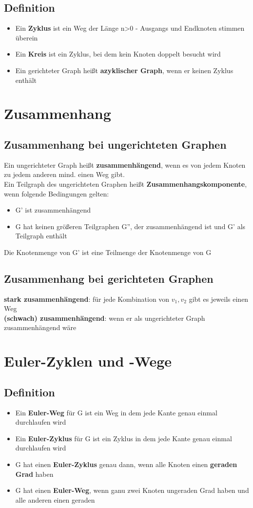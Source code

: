 \documentclass{scrreprt}
\begin{document}
\subsection{Definition}
\begin{itemize}
    \item Ein \textbf{Zyklus} ist ein Weg der Länge n>0 - Ausgangs und Endknoten stimmen überein
    \item Ein \textbf{Kreis} ist ein Zyklus, bei dem kein Knoten doppelt besucht wird
    \item Ein gerichteter Graph heißt \textbf{azyklischer Graph}, wenn er keinen Zyklus enthält
\end{itemize}
\section{Zusammenhang}
\subsection{Zusammenhang bei ungerichteten Graphen}
Ein ungerichteter Graph heißt \textbf{zusammenhängend}, wenn es von jedem Knoten zu jedem anderen mind. einen Weg gibt.
\\Ein Teilgraph des ungerichteten Graphen heißt \textbf{Zusammenhangskomponente}, wenn folgende Bedingungen gelten:
\begin{itemize}
    \item G' ist zusammenhängend
    \item G hat keinen größeren Teilgraphen G'', der zusammenhängend ist und G' als Teilgraph enthält 
\end{itemize}
Die Knotenmenge von G' ist eine Teilmenge der Knotenmenge von G
\subsection{Zusammenhang bei gerichteten Graphen}
\textbf{stark zusammenhängend}: für jede Kombination von $v_{1},v_{2}$ gibt es jeweils einen Weg
\\\textbf{(schwach) zusammenhängend}: wenn er als ungerichteter Graph zusammenhängend wäre
\section{Euler-Zyklen und -Wege}
\subsection{Definition}
\begin{itemize}
    \item Ein \textbf{Euler-Weg} für G ist ein Weg in dem jede Kante genau einmal durchlaufen wird
    \item Ein \textbf{Euler-Zyklus} für G ist ein Zyklus in dem jede Kante genau einmal durchlaufen wird
    \item G hat einen \textbf{Euler-Zyklus} genau dann, wenn alle Knoten einen \textbf{geraden Grad} haben
    \item G hat einen \textbf{Euler-Weg}, wenn ganu zwei Knoten ungeraden Grad haben und alle anderen einen geraden
\end{itemize}
\end{document}
